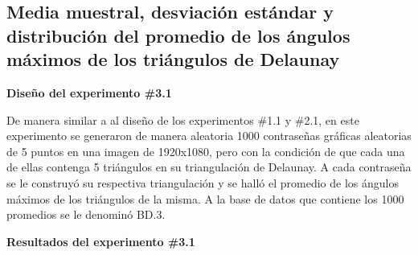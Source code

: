 \documentclass[12pt]{report}
\begin{document}
\subsection{Media muestral, desviación estándar y distribución del promedio de los ángulos máximos de los triángulos de Delaunay}
\label{sec:3.1}

\textbf{ Diseño del experimento \#3.1}

De manera similar a al diseño de los experimentos \#1.1 y \#2.1, en este experimento se generaron de manera aleatoria 1000 contraseñas gráficas aleatorias de 5 puntos en una imagen de 1920x1080, pero con la condición de que cada una de ellas contenga 5 triángulos en su triangulación de Delaunay. A cada contraseña se le construyó su respectiva triangulación y se halló el promedio de los ángulos máximos de los triángulos de la misma. A la base de datos que contiene los 1000 promedios se le denominó BD.3.



\textbf{Resultados del experimento \#3.1}
\end{document}
